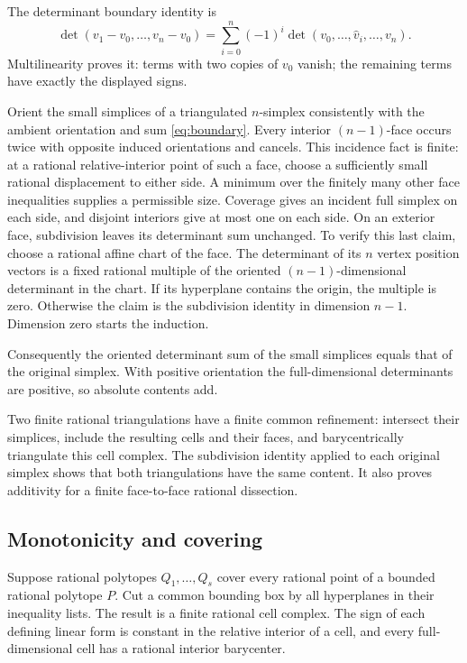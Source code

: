 The determinant boundary identity is
\begin{equation}\label{eq:boundary}
 \det(v_1-v_0,\ldots,v_n-v_0)
 =\sum_{i=0}^n(-1)^i
      \det(v_0,\ldots,\widehat v_i,\ldots,v_n).
\end{equation}
Multilinearity proves it: terms with two copies
of \(v_0\) vanish; the remaining terms have
exactly the displayed signs.

Orient the small simplices of a triangulated
\(n\)-simplex consistently with the ambient
orientation and sum \cref{eq:boundary}.
Every interior \((n-1)\)-face occurs twice
with opposite induced orientations and cancels.
This incidence fact is finite: at a rational
relative-interior point of such a face, choose
a sufficiently small rational displacement to
either side. A minimum over the finitely many
other face inequalities supplies a permissible
size. Coverage gives an incident full simplex
on each side, and disjoint interiors give at
most one on each side.
On an exterior face, subdivision leaves its
determinant sum unchanged. To verify this last
claim, choose a rational affine chart of the
face. The determinant of its \(n\) vertex
position vectors is a fixed rational multiple
of the oriented \((n-1)\)-dimensional determinant
in the chart. If its hyperplane contains the
origin, the multiple is zero. Otherwise the
claim is the subdivision identity in dimension
\(n-1\). Dimension zero starts the induction.

Consequently the oriented determinant sum of
the small simplices equals that of the original
simplex. With positive orientation the
full-dimensional determinants are positive,
so absolute contents add.

Two finite rational triangulations have a finite
common refinement: intersect their simplices,
include the resulting cells and their faces,
and barycentrically triangulate this cell
complex. The subdivision identity applied to
each original simplex shows that both
triangulations have the same content.
It also proves additivity for a finite
face-to-face rational dissection.

\subsection{Monotonicity and covering}

Suppose rational polytopes \(Q_1,\ldots,Q_s\)
cover every rational point of a bounded
rational polytope \(P\). Cut a common bounding
box by all hyperplanes in their inequality
lists. The result is a finite rational cell
complex. The sign of each defining linear
form is constant in the relative interior of
a cell, and every full-dimensional cell has
a rational interior barycenter.

